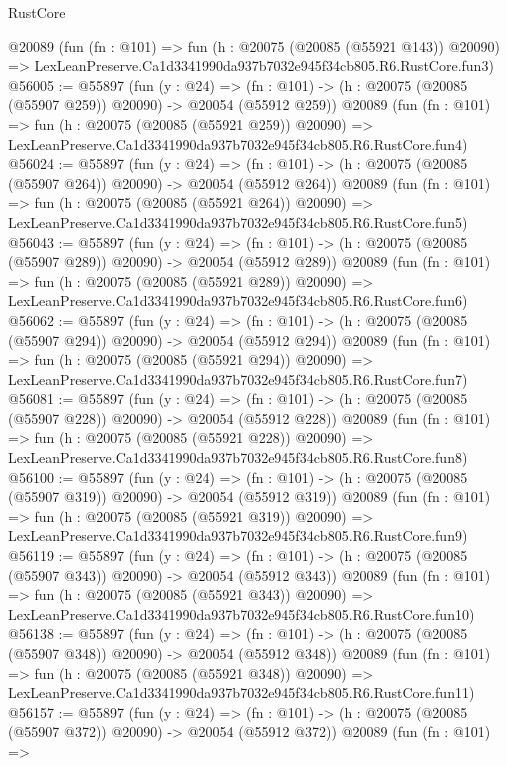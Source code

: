 \begin{lexlean}{RustCore}
\begin{coremodule}
    @20089
    (fun (fn : @101) =>
    fun (h : @20075 (@20085 (@55921 @143)) @20090) =>
    LexLeanPreserve.Ca1d3341990da937b7032e945f34cb805.R6.RustCore.fun3)
@56005 := @55897
    (fun (y : @24) =>
    (fn : @101) -> (h : @20075 (@20085 (@55907 @259)) @20090) -> @20054 (@55912 @259))
    @20089
    (fun (fn : @101) =>
    fun (h : @20075 (@20085 (@55921 @259)) @20090) =>
    LexLeanPreserve.Ca1d3341990da937b7032e945f34cb805.R6.RustCore.fun4)
@56024 := @55897
    (fun (y : @24) =>
    (fn : @101) -> (h : @20075 (@20085 (@55907 @264)) @20090) -> @20054 (@55912 @264))
    @20089
    (fun (fn : @101) =>
    fun (h : @20075 (@20085 (@55921 @264)) @20090) =>
    LexLeanPreserve.Ca1d3341990da937b7032e945f34cb805.R6.RustCore.fun5)
@56043 := @55897
    (fun (y : @24) =>
    (fn : @101) -> (h : @20075 (@20085 (@55907 @289)) @20090) -> @20054 (@55912 @289))
    @20089
    (fun (fn : @101) =>
    fun (h : @20075 (@20085 (@55921 @289)) @20090) =>
    LexLeanPreserve.Ca1d3341990da937b7032e945f34cb805.R6.RustCore.fun6)
@56062 := @55897
    (fun (y : @24) =>
    (fn : @101) -> (h : @20075 (@20085 (@55907 @294)) @20090) -> @20054 (@55912 @294))
    @20089
    (fun (fn : @101) =>
    fun (h : @20075 (@20085 (@55921 @294)) @20090) =>
    LexLeanPreserve.Ca1d3341990da937b7032e945f34cb805.R6.RustCore.fun7)
@56081 := @55897
    (fun (y : @24) =>
    (fn : @101) -> (h : @20075 (@20085 (@55907 @228)) @20090) -> @20054 (@55912 @228))
    @20089
    (fun (fn : @101) =>
    fun (h : @20075 (@20085 (@55921 @228)) @20090) =>
    LexLeanPreserve.Ca1d3341990da937b7032e945f34cb805.R6.RustCore.fun8)
@56100 := @55897
    (fun (y : @24) =>
    (fn : @101) -> (h : @20075 (@20085 (@55907 @319)) @20090) -> @20054 (@55912 @319))
    @20089
    (fun (fn : @101) =>
    fun (h : @20075 (@20085 (@55921 @319)) @20090) =>
    LexLeanPreserve.Ca1d3341990da937b7032e945f34cb805.R6.RustCore.fun9)
@56119 := @55897
    (fun (y : @24) =>
    (fn : @101) -> (h : @20075 (@20085 (@55907 @343)) @20090) -> @20054 (@55912 @343))
    @20089
    (fun (fn : @101) =>
    fun (h : @20075 (@20085 (@55921 @343)) @20090) =>
    LexLeanPreserve.Ca1d3341990da937b7032e945f34cb805.R6.RustCore.fun10)
@56138 := @55897
    (fun (y : @24) =>
    (fn : @101) -> (h : @20075 (@20085 (@55907 @348)) @20090) -> @20054 (@55912 @348))
    @20089
    (fun (fn : @101) =>
    fun (h : @20075 (@20085 (@55921 @348)) @20090) =>
    LexLeanPreserve.Ca1d3341990da937b7032e945f34cb805.R6.RustCore.fun11)
@56157 := @55897
    (fun (y : @24) =>
    (fn : @101) -> (h : @20075 (@20085 (@55907 @372)) @20090) -> @20054 (@55912 @372))
    @20089
    (fun (fn : @101) =>

\end{coremodule}
\end{lexlean}
